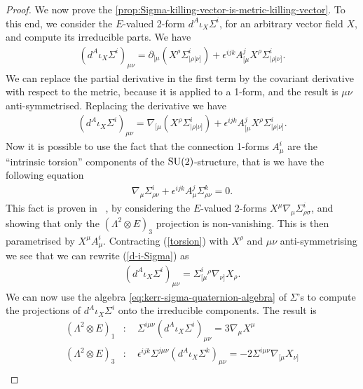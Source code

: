 \documentclass[10pt]{report}
\theoremstyle{definition}
\begin{document}
\begin{proof}
We now prove the \cref{prop:Sigma-killing-vector-is-metric-killing-vector}. To this end, we consider the $E$-valued 2-form $d^A \iota_X \Sigma^i$, for an arbitrary vector field $X$, and compute its irreducible parts. We have
\begin{align}
    (d^A \iota_X \Sigma^i)_{\mu \nu} = \partial_{[\mu} ( X^{\rho} \Sigma^i_{|\rho| \nu]} )  + \epsilon^{ijk} A^j_{[\mu} X^{\rho} \Sigma^i_{|\rho| \nu]}.
   \end{align}
We can replace the partial derivative in the first term by the covariant derivative with respect to the metric, because it is applied to a 1-form, and the result is $\mu\nu$ anti-symmetrised. Replacing the derivative we have
  \begin{align}\label{d-i-Sigma}
    (d^A \iota_X \Sigma^i)_{\mu \nu}   = \nabla_{[\mu} ( X^{\rho} \Sigma^i_{|\rho| \nu]} )  + \epsilon^{ijk} A^j_{[\mu} X^{\rho} \Sigma^i_{|\rho| \nu]}.
     \end{align} 
 Now it is possible to use the fact that the connection 1-forms $A^i_\mu$ are the ``intrinsic torsion'' components of the ${\rm SU}(2)$-structure, that is we have the following equation
  \begin{align}\label{torsion}
 \nabla_\mu \Sigma^i_{\rho\nu} + \epsilon^{ijk} A^j_\mu \Sigma^k_{\rho\nu}=0.
  \end{align} 
 This fact is proven in ~\cite{Su2StructureBhoja2024}, by considering the $E$-valued 2-forms $X^\mu \nabla_\mu \Sigma^i_{\rho\sigma}$, and showing that only the $(\Lambda^2 \otimes E)_3$ projection is non-vanishing. This is then parametrised by $X^\mu A_\mu^i$. Contracting (\ref{torsion}) with $X^\rho$ and $\mu\nu$ anti-symmetrising we see that we can rewrite (\ref{d-i-Sigma}) as
 \begin{align}   
    (d^A \iota_X \Sigma^i)_{\mu \nu}  = \Sigma^i_{[\mu}{}^\rho \nabla_{\nu]} X_\rho.
 \end{align}
We can now use the algebra \cref{eq:kerr-sigma-quaternion-algebra} of $\Sigma$'s to compute the projections of 
 $d^A \iota_X \Sigma^i$ onto the irreducible components. The result is
\begin{align}
    (\Lambda^2 \otimes E)_1&:  \quad \Sigma^{i\mu\nu} (d^A \iota_X \Sigma^i)_{\mu \nu} = 3 \nabla_\mu X^\mu \nonumber\\
    (\Lambda^2 \otimes E)_3&: \quad \epsilon^{ijk} \Sigma^{j\mu \nu} (d^A \iota_X \Sigma^k)_{\mu \nu} = -2\Sigma^{i \mu \nu} \nabla_{[\mu} X_{\nu]} \\

\end{align}
\end{proof}
\end{document}
